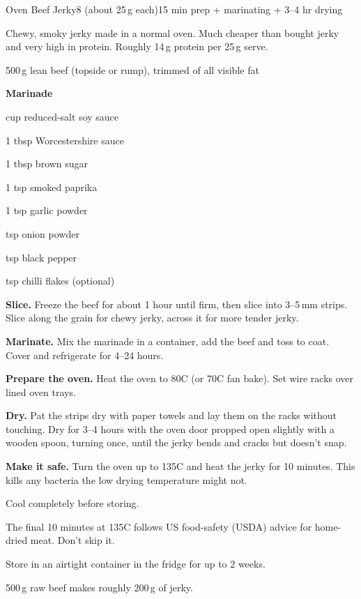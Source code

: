 \begin{recipebox}{Oven Beef Jerky}{8 (about 25\,g each)}{15 min prep + marinating + 3--4 hr drying}

Chewy, smoky jerky made in a normal oven. Much cheaper than bought jerky and
very high in protein. Roughly 14\,g protein per 25\,g serve.

\begin{ingredients}
  \item 500\,g lean beef (topside or rump), trimmed of all visible fat
  \item[] \textbf{Marinade}
  \item {} cup reduced-salt soy sauce
  \item 1 tbsp Worcestershire sauce
  \item 1 tbsp brown sugar
  \item 1 tsp smoked paprika
  \item 1 tsp garlic powder
  \item {} tsp onion powder
  \item {} tsp black pepper
  \item {} tsp chilli flakes (optional)
\end{ingredients}

\begin{method}
  \item \textbf{Slice.} Freeze the beef for about 1 hour until firm, then slice into 3--5\,mm strips. Slice along the grain for chewy jerky, across it for more tender jerky.
  \item \textbf{Marinate.} Mix the marinade in a container, add the beef and toss to coat. Cover and refrigerate for 4--24 hours.
  \item \textbf{Prepare the oven.} Heat the oven to 80\degree C (or 70\degree C fan bake). Set wire racks over lined oven trays.
  \item \textbf{Dry.} Pat the strips dry with paper towels and lay them on the racks without touching. Dry for 3--4 hours with the oven door propped open slightly with a wooden spoon, turning once, until the jerky bends and cracks but doesn't snap.
  \item \textbf{Make it safe.} Turn the oven up to 135\degree C and heat the jerky for 10 minutes. This kills any bacteria the low drying temperature might not.
  \item Cool completely before storing.
\end{method}

\begin{notelist}
  \item The final 10 minutes at 135\degree C follows US food-safety (USDA) advice for home-dried meat. Don't skip it.
  \item Store in an airtight container in the fridge for up to 2 weeks.
  \item 500\,g raw beef makes roughly 200\,g of jerky.
\end{notelist}

\end{recipebox}
